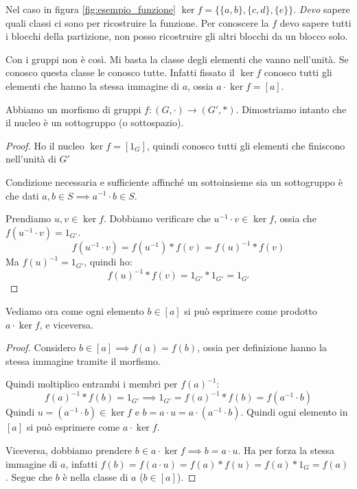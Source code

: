 Nel caso in figura \ref{fig:esempio_funzione} $\ker f = \{ \{a, b \}, \{ c, d \}, \{ e \}\}$. \textit{Devo} sapere quali classi ci sono per ricostruire la funzione. Per conoscere la $f$ devo sapere tutti i blocchi della partizione, non posso ricostruire gli altri blocchi da un blocco solo.

Con i gruppi non \`e cos\`i. Mi basta la classe degli elementi che vanno nell'unit\`a. Se conosco questa classe le conosco tutte. Infatti fissato il $\ker f$ conosco tutti gli elementi che hanno la stessa immagine di $a$, ossia $a \cdot \ker f = [a]$.

Abbiamo un morfismo di gruppi $ f : (G, \cdot ) \to (G', \ast)$. Dimostriamo intanto che il nucleo \`e un sottogruppo (o sottospazio).
\begin{proof}
Ho il nucleo $\ker f = [1_G]$, quindi conosco tutti gli elementi che finiscono nell'unit\`a di $G'$

Condizione necessaria e sufficiente affinch\'e un sottoinsieme sia un sottogruppo \`e che dati $a, b \in S \implies a^{-1} \cdot b \in S$.

Prendiamo $u, v \in \ker f$. Dobbiamo verificare che $u^{-1} \cdot v \in \ker f$, ossia che $f ( u^{-1} \cdot v ) = 1_{G'}$.
\[
f( u^{-1} \cdot v ) = f(u^{-1}) \ast f(v) = f(u)^{-1} \ast f(v)
\]
Ma $f(u)^{-1} = 1_{G'}$, quindi ho:
\[
f(u)^{-1} \ast f(v) = 1_{G'} \ast 1_{G'} = 1_{G'}
\]
\end{proof}
Vediamo ora come ogni elemento $b \in [a]$ si pu\`o esprimere come prodotto $a \cdot \ker f$, e viceversa.
\begin{proof}
Considero $b \in [a] \implies f(a) = f(b)$, ossia per definizione hanno la stessa immagine tramite il morfismo.

Quindi moltiplico entrambi i membri per $f(a)^{-1}$:
\[
f(a)^{-1} \ast f(b) = 1_{G'} \implies 1_{G'} = f(a)^{-1} \ast f(b) = f(a^{-1} \cdot b)
\]
Quindi $u = (a^{-1} \cdot b ) \in \ker f$ e $b = a \cdot u = a \cdot (a^{-1} \cdot b)$. Quindi ogni elemento in $[a]$ si pu\`o esprimere come $a \cdot \ker f$.

Viceversa, dobbiamo prendere $b \in a \cdot \ker f \implies b = a \cdot u$. Ha per forza la stessa immagine di $a$, infatti $f(b) = f(a \cdot u) = f(a) \ast f(u) = f(a) \ast 1_G = f(a)$. Segue che $b$ \`e nella classe di $a$ ($ b \in [a]$).
\end{proof}


